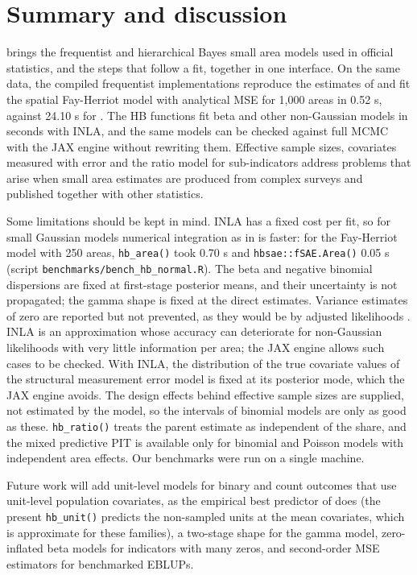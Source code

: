 \section{Summary and discussion}\label{sec:summary}

 brings the frequentist and hierarchical Bayes small area models used in official statistics, and the steps that follow a fit, together in one interface. On the same data, the compiled frequentist implementations reproduce the estimates of  and fit the spatial Fay-Herriot model with analytical MSE for 1,000 areas in 0.52 s, against 24.10 s for . The HB functions fit beta and other non-Gaussian models in seconds with INLA, and the same models can be checked against full MCMC with the JAX engine without rewriting them. Effective sample sizes, covariates measured with error and the ratio model for sub-indicators address problems that arise when small area estimates are produced from complex surveys and published together with other statistics.

Some limitations should be kept in mind. INLA has a fixed cost per fit, so for small Gaussian models numerical integration as in  is faster: for the Fay-Herriot model with 250 areas, \texttt{hb\_area()} took 0.70 s and \texttt{hbsae::fSAE.Area()} 0.05 s (script \texttt{benchmarks/bench\_hb\_normal.R}). The beta and negative binomial dispersions are fixed at first-stage posterior means, and their uncertainty is not propagated; the gamma shape is fixed at the direct estimates. Variance estimates of zero are reported but not prevented, as they would be by adjusted likelihoods \citep{yoshimori2014new}. INLA is an approximation whose accuracy can deteriorate for non-Gaussian likelihoods with very little information per area; the JAX engine allows such cases to be checked. With INLA, the distribution of the true covariate values of the structural measurement error model is fixed at its posterior mode, which the JAX engine avoids. The design effects behind effective sample sizes are supplied, not estimated by the model, so the intervals of binomial models are only as good as these. \texttt{hb\_ratio()} treats the parent estimate as independent of the share, and the mixed predictive PIT is available only for binomial and Poisson models with independent area effects. Our benchmarks were run on a single machine.

Future work will add unit-level models for binary and count outcomes that use unit-level population covariates, as the empirical best predictor of \citet{molina2010small} does (the present \texttt{hb\_unit()} predicts the non-sampled units at the mean covariates, which is approximate for these families), a two-stage shape for the gamma model, zero-inflated beta models for indicators with many zeros, and second-order MSE estimators for benchmarked EBLUPs.

